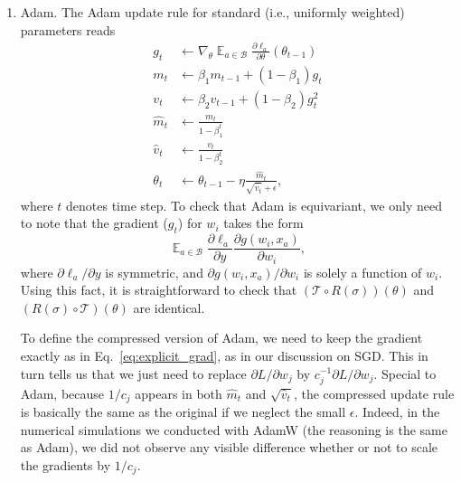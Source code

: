 \documentclass{article}
\theoremstyle{plain}
\newcommand{\Exp}{\mathop{\mathbb{E}}}
\begin{document}
\begin{enumerate}
    Finally, we remark on non-deterministic updates. It seems that choosing mini-batches turns the update into a stochastic process, which complicates the problem. But in fact, for any fixed trajectory of mini-batch choices, the update is explicitly equivariant (choosing a mini-batch breaks the permutation symmetry among the training dataset, but not the permutation symmetry of neurons). Therefore, we always expect to see good agreement between the original and compressed dynamics if we use the same choice of mini-batches for both. 
    
    \item Adam. The Adam update rule for standard (i.e., uniformly weighted) parameters reads
    \begin{equation}
        \begin{aligned}
            g_t &\leftarrow \nabla_{\theta} \Exp_{a\in\mathcal{B}}\frac{\partial\ell_a}{\partial \theta} (\theta_{t-1}) \\
            m_t &\leftarrow \beta_1 m_{t-1} + (1-\beta_1) g_t    \\
            v_t &\leftarrow \beta_2 v_{t-1} + (1-\beta_2) g_t^2 \\
            \hat{m}_t &\leftarrow \frac{m_t}{1-\beta_1^t}   \\
            \hat{v}_t &\leftarrow \frac{v_t}{1-\beta_2^t}   \\
            \theta_t &\leftarrow \theta_{t-1} - \eta \frac{\hat{m}_t}{\sqrt{\hat{v}_t}+\epsilon}  ,
        \end{aligned}
    \end{equation}
    where $t$ denotes time step. To check that Adam is equivariant, we only need to note that the gradient ($g_t$) for $w_i$ takes the form 
    \begin{equation}    \label{eq:explicit_grad}
        \Exp_{a\in\mathcal{B}}\frac{\partial \ell_a}{\partial y} \frac{\partial g(w_i, x_a)}{\partial w_i}  ,
    \end{equation}
    where $\partial\ell_a/\partial y$ is symmetric, and $\partial g(w_i, x_a)/\partial w_i$ is solely a function of $w_i$. Using this fact, it is straightforward to check that $(\mathcal{T}\circ R(\sigma))(\theta)$ and $(R(\sigma) \circ \mathcal{T})(\theta)$ are identical. 
    
    To define the compressed version of Adam, we need to keep the gradient exactly as in Eq.~\eqref{eq:explicit_grad}, as in our discussion on SGD. This in turn tells us that we just need to replace $\partial L/\partial w_j$ by $c_j^{-1} \partial L/\partial w_j$. Special to Adam, because $1/c_j$ appears in both $\hat{m}_t$ and $\sqrt{\hat{v}_t}$, the compressed update rule is basically the same as the original if we neglect the small $\epsilon$. Indeed, in the numerical simulations we conducted with AdamW (the reasoning is the same as Adam), we did not observe any visible difference whether or not to scale the gradients by $1/c_j$. 
\end{enumerate}
\end{document}
